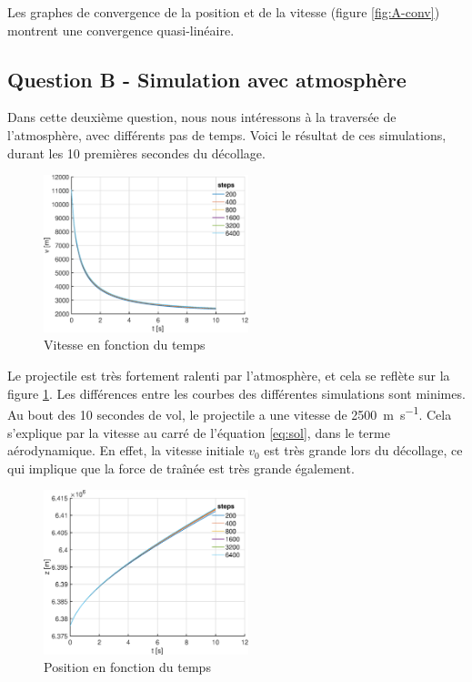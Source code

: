 \documentclass[a4paper,12pt,twoside]{article}
\begin{document}
Les graphes de convergence de la position et de la vitesse (figure \ref{fig:A-conv}) montrent une convergence quasi-linéaire. 

\subsection{Question B - Simulation avec atmosphère}
Dans cette deuxième question, nous nous intéressons à la traversée de l'atmosphère, avec différents pas de temps.
Voici le résultat de ces simulations, durant les 10 premières secondes du décollage.\\

\begin{figure}[h]
	\centering
    \includegraphics[width=0.53\textwidth]{graphs/vB.eps}
    \caption{Vitesse en fonction du temps}
    \label{fig:B-vt}
\end{figure}

Le projectile est très fortement ralenti par l'atmosphère, et cela se reflète sur la figure \ref{fig:B-vt}.
Les différences entre les courbes des différentes simulations sont minimes.
Au bout des 10 secondes de vol, le projectile a une vitesse de \SI{2500}{\meter\per\second}.
Cela s'explique par la vitesse au carré de l'équation \ref{eq:sol}, dans le terme aérodynamique.
En effet, la vitesse initiale $v_0$ est très grande lors du décollage, ce qui implique que la force de traînée est très grande également.\\


\begin{figure}[h]
	\centering
	\includegraphics[width=0.53\textwidth]{graphs/zB.eps}
	\caption{Position en fonction du temps}
	\label{fig:B-zt}
\end{figure}
\end{document}
